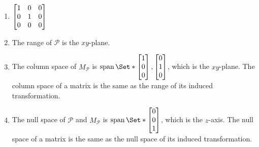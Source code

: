 \begin{exercises}
\begin{problist}
		\begin{solution}
			\begin{enumerate}
				\item $\mat{1&0&0\\0&1&0\\0&0&0}$
				\item The range of $\mathcal{P}$ is the $xy$-plane.
				\item The column space of $M_\mathcal{P}$ is $\Span\Set*{\mat{1\\0\\0},\mat{0\\1\\0}}$, which is the $xy$-plane. The column space of a matrix is the same as the range of its induced transformation.
				\item The null space of $\mathcal{P}$ and $M_\mathcal{P}$ is $\Span\Set*{\mat{0\\0\\1}}$, which is the $z$-axis. The null space of a matrix is the same as the null space of its induced transformation.
			\end{enumerate}
		\end{solution}
	\end{problist}
\end{exercises}

